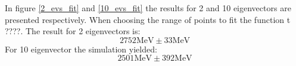     In figure \ref{2_evs_fit} and \ref{10_evs_fit} the results for 2 and 10 eigenvectors are presented respectively. When choosing the range of points to fit the function t ????. The result for 2 eigenvectors is:
    $$ 2752 \text{MeV} \pm 33 \text{MeV} $$
    For 10 eigenvector the simulation yielded:
    $$ 2501 \text{MeV} \pm 392 \text{MeV} $$